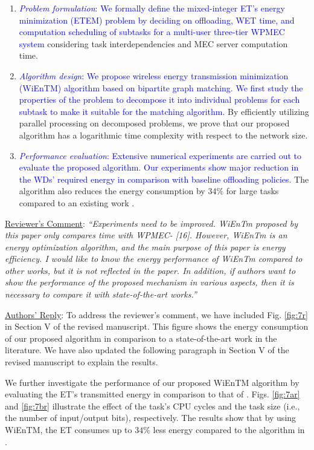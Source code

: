 \documentclass[12pt,draftclsnofoot,onecolumn]{IEEEtran}
\newcommand{\rev}[1]{{\color{blue}#1}} %
\newcommand{\rev}[1]{#1}
\newenvironment{my}[2]%
{\begin{list}{}%
{\setlength{\rightmargin}{#1}\setlength{\leftmargin}{#2}}%


 \item[]{}

} {\end{list}}
\begin{document}
\begin{enumerate}
\begin{my}{1cm}{1cm}
{		\begin{enumerate}
			\item \textcolor{blue}{\textit{Problem formulation}: We formally define the mixed-integer ET's energy minimization (ETEM) problem by deciding on offloading, WET time, and computation scheduling of subtasks for a multi-user three-tier WPMEC system} considering task interdependencies and MEC server computation time.
			\item \textcolor{blue}{\textit{Algorithm design}: We propose wireless energy transmission minimization (WiEnTM) algorithm based on bipartite graph matching. We first study the properties of the problem to decompose it into individual problems for each subtask to make it suitable for the matching algorithm.} By efficiently utilizing parallel processing on decomposed problems, we prove that our proposed algorithm has a logarithmic time complexity with respect to the network size.
			\item \textcolor{blue}{\textit{Performance evaluation}: Extensive numerical experiments are carried out to evaluate the proposed algorithm. Our experiments show major reduction in the WDs' required energy in comparison with baseline offloading policies.} The algorithm also reduces the energy consumption by 34\% for large tasks compared to an existing work \cite{b13}.\\
		\end{enumerate}
	}
\end{my}

\item \underline{Reviewer's Comment}: \textit {``Experiments need to be improved. WiEnTm proposed by this paper only compares time with WPMEC- [16]. However, WiEnTm is an energy optimization algorithm, and the main purpose of this paper is energy efficiency. I would like to know the energy performance of WiEnTm compared to other works, but it is not reflected in the paper. In addition, if authors want to show the performance of the proposed mechanism in various aspects, then it is necessary to compare it with state-of-the-art works.''} \newline

\underline{Authors' Reply}: To address the reviewer's comment, we have included Fig. \ref{fig:7r} in Section V of the revised manuscript. This figure shows the energy consumption of our proposed algorithm in comparison to a state-of-the-art work in the literature. We have also updated the following paragraph in Section V of the revised manuscript to explain the results.\newline
\begin{my}{1cm}{1cm}
	\rev{We further investigate the performance of our proposed WiEnTM algorithm by evaluating the ET's transmitted energy in comparison to that of \cite{b13}. Figs. \ref{fig:7ar} and \ref{fig:7br} illustrate the effect of the task's CPU cycles and the task size (i.e., the number of input/output bits), respectively. The results show that by using WiEnTM, the ET consumes up to $34\%$ less energy compared to the algorithm in \cite{b13}.\\
	}


\end{my}
\end{enumerate}
\end{document}
